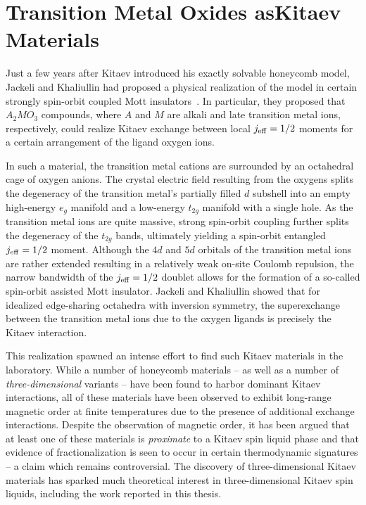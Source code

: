 \chapter[Transition Metal Oxides as Kitaev Materials]{Transition Metal Oxides as\linebreak Kitaev Materials}
\label{chapter:TransitionMetalOxides}
%
%
Just a few years after Kitaev introduced his exactly solvable honeycomb model, Jackeli and Khaliullin had proposed a physical realization of the model in certain strongly spin-orbit coupled Mott insulators~\cite{JackeliPRL2009}.
In particular, they proposed that $A_2MO_3$ compounds, where $A$ and $M$ are alkali and late transition metal ions, respectively, could realize Kitaev exchange between local $j_{\rm eff} = 1/2$ moments for a certain arrangement of the ligand oxygen ions.

In such a material, the transition metal cations are surrounded by an octahedral cage of oxygen anions.
The crystal electric field resulting from the oxygens splits the degeneracy of the transition metal's partially filled $d$ subshell into an empty high-energy $e_g$ manifold and a low-energy $t_{2g}$ manifold with a single hole.
As the transition metal ions are quite massive, strong spin-orbit coupling further splits the degeneracy of the $t_{2g}$ bands, ultimately yielding a spin-orbit entangled $j_{\rm eff} = 1/2$ moment.
Although the $4d$ and $5d$ orbitals of the transition metal ions are rather extended resulting in a relatively weak on-site Coulomb repulsion, the narrow bandwidth of the $j_{\rm eff} = 1/2$ doublet allows for the formation of a so-called spin-orbit assisted Mott insulator.
Jackeli and Khaliullin showed that for idealized edge-sharing octahedra with inversion symmetry, the superexchange between the transition metal ions due to the oxygen ligands is precisely the Kitaev interaction.

This realization spawned an intense effort to find such Kitaev materials in the laboratory.
While a number of honeycomb materials -- as well as a number of \textit{three-dimensional} variants -- have been found to harbor dominant Kitaev interactions, all of these materials have been observed to exhibit long-range magnetic order at finite temperatures due to the presence of additional exchange interactions.
Despite the observation of magnetic order, it has been argued that at least one of these materials is \textit{proximate} to a Kitaev spin liquid phase and that evidence of fractionalization is seen to occur in certain thermodynamic signatures -- a claim which remains controversial.
The discovery of three-dimensional Kitaev materials has sparked much theoretical interest in three-dimensional Kitaev spin liquids, including the work reported in this thesis.

